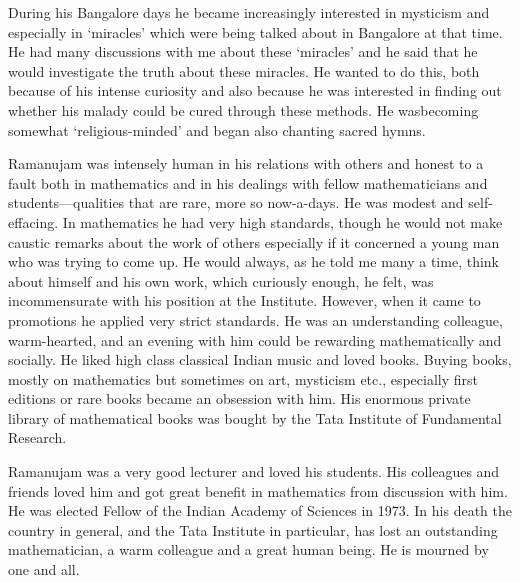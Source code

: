 During his Bangalore days he became increasingly interested in 
mysticism and especially in `miracles' which were being talked about 
in Bangalore at that time. He had many discussions with me about these 
`miracles' and he said that he would investigate the truth about these 
miracles. He wanted to do this, both because of his intense curiosity 
and also because he was interested in finding out whether his malady 
could be cured through these methods. He was\pageoriginale becoming 
somewhat `religious-minded' and began also chanting sacred hymns.

Ramanujam was intensely human in his relations with others and honest 
to a fault both in mathematics and in his dealings with fellow 
mathematicians and students---qualities that are rare, more so 
now-a-days. He was modest and self-effacing. In mathematics he had 
very high standards, though he would not make caustic remarks about 
the work of others especially if it concerned a young man who was 
trying to come up. He would always, as he told me many a time, think 
about himself and his own work, which curiously enough, he felt, was 
incommensurate with his position at the Institute. However, when it 
came to promotions he applied very strict standards. He was an 
understanding colleague, warm-hearted, and an evening with him could 
be rewarding mathematically and socially. He liked high class 
classical Indian music and loved books. Buying books, mostly on 
mathematics but sometimes on art, mysticism etc., especially first 
editions or rare books became an obsession with him. His enormous 
private library of mathematical books was bought by the Tata Institute 
of Fundamental Research.

Ramanujam was a very good lecturer and loved his students. His 
colleagues and friends loved him and got great benefit in mathematics 
from discussion with him. He was elected Fellow of the Indian Academy 
of Sciences in 1973. In his death the country in general, and the Tata 
Institute in particular, has lost an outstanding mathematician, a warm 
colleague and a great human being. He is mourned by one and all. 

\vfill\eject

~\phantom{A}
\thispagestyle{empty}


